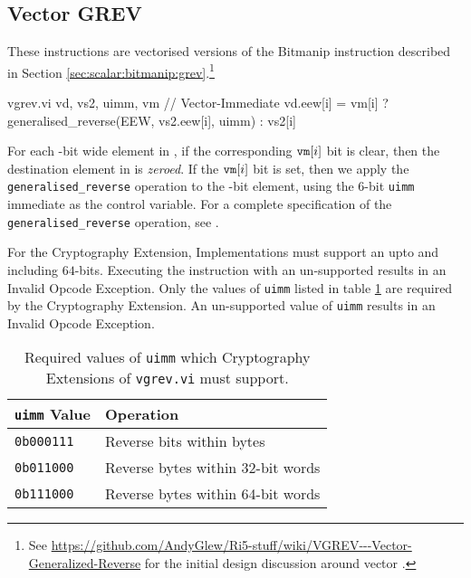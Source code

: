 
\subsection{Vector GREV}

These instructions are vectorised versions of the Bitmanip
 instruction described in
Section \ref{sec:scalar:bitmanip:grev}.\footnote{
See \url{https://github.com/AndyGlew/Ri5-stuff/wiki/VGREV---Vector-Generalized-Reverse}
for the initial design discussion around vector .
}

\begin{cryptoisa}
vgrev.vi     vd, vs2, uimm, vm  // Vector-Immediate
    vd.eew[i] = vm[i] ? generalised_reverse(EEW, vs2.eew[i], uimm) : vs2[i]
\end{cryptoisa}

For each \EEW-bit wide element in , if the corresponding ${\tt vm}[i]$
bit is clear, then the destination element in \vrd is {\em zeroed}.
If the ${\tt vm}[i]$ bit is set, then we apply the
\texttt{generalised\_reverse} operation to the \EEW-bit element, using the
$6$-bit \texttt{uimm} immediate as the control variable.
For a complete specification of the \texttt{generalised\_reverse}
operation, see 
\cite[Section 2.2.2, Generalized Reverse]{riscv:bitmanip:draft}.

For the Cryptography Extension,
Implementations must support an \EEW upto and including $64$-bits.
Executing the instruction with an un-supported \EEW results in an
Invalid Opcode Exception.
Only the values of \texttt{uimm} listed in table \ref{tab:vgrev:uimm}
are required by the Cryptography Extension.
An un-supported value of \texttt{uimm} results in an
Invalid Opcode Exception.

\begin{table}
\centering
\begin{tabular}{ll}
\texttt{uimm} Value & Operation                         \\
\hline
\texttt{0b000111}   & Reverse bits within bytes         \\
\texttt{0b011000}   & Reverse bytes within 32-bit words \\
\texttt{0b111000}   & Reverse bytes within 64-bit words \\
\hline
\end{tabular}
\caption{Required values of \texttt{uimm} which Cryptography Extensions
of \texttt{vgrev.vi} must support.}
\label{tab:vgrev:uimm}
\end{table}
